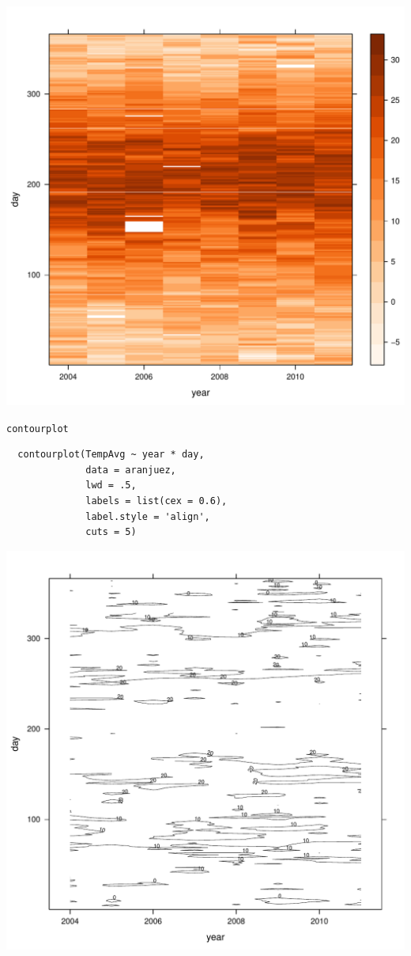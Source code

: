 \documentclass[xcolor={usenames,svgnames,dvipsnames}]{beamer}
\begin{document}
\begin{frame}[label=sec-2-1-37]{}
\includegraphics[width=.9\linewidth]{figs/levelplotPal.pdf}
\end{frame}

\begin{frame}[fragile,label=sec-2-1-38]{\texttt{contourplot}}
 \lstset{language=R,label= ,caption= ,numbers=none}
\begin{lstlisting}
  contourplot(TempAvg ~ year * day,
              data = aranjuez,
              lwd = .5,
              labels = list(cex = 0.6),
              label.style = 'align',
              cuts = 5)
\end{lstlisting}
\end{frame}

\begin{frame}[label=sec-2-1-39]{}
\includegraphics[width=.9\linewidth]{figs/contourplot.pdf}
\end{frame}
\end{document}
